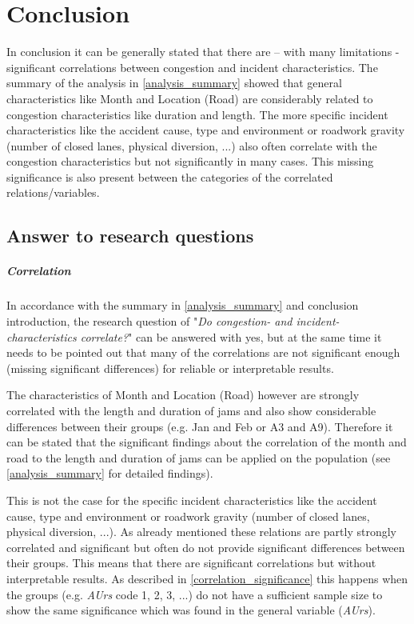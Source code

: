 \chapter{Conclusion}
In conclusion it can be generally stated that there are – with many limitations - significant correlations between congestion and incident characteristics. The summary of the analysis in \cref{analysis_summary} showed that general characteristics like Month and Location (Road) are considerably related to congestion characteristics like duration and length. The more specific incident characteristics like the accident cause, type and environment or roadwork gravity (number of closed lanes, physical diversion, ...) also often correlate with the congestion characteristics but not significantly in many cases. This missing significance is also present between the categories of the correlated relations/variables.

\section{Answer to research questions}
\paragraph{Correlation}
In accordance with the summary in \cref{analysis_summary} and conclusion introduction, the research question of "\textit{Do congestion- and incident-characteristics correlate?}" can be answered with yes, but at the same time it needs to be pointed out that many of the correlations are not significant enough (missing significant differences) for reliable or interpretable results.

The characteristics of Month and Location (Road) however are strongly correlated with the length and duration of jams and also show considerable differences between their groups (e.g. Jan and Feb or A3 and A9). Therefore it can be stated that the significant findings about the correlation of the month and road to the length and duration of jams can be applied on the population (see \cref{analysis_summary} for detailed findings).

This is not the case for the specific incident characteristics like the accident cause, type and environment or roadwork gravity (number of closed lanes, physical diversion, ...). As already mentioned these relations are partly strongly correlated and significant but often do not provide significant differences between their groups. This means that there are significant correlations but without interpretable results. As described in \cref{correlation_significance} this happens when the groups (e.g. \textit{AUrs} code 1, 2, 3, ...) do not have a sufficient sample size to show the same significance which was found in the general variable (\textit{AUrs}).

